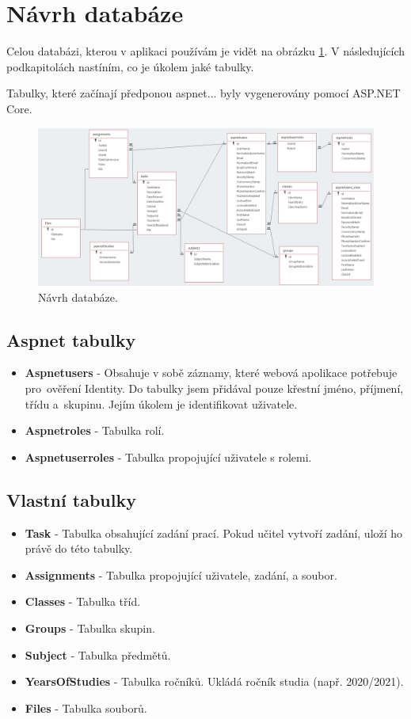 \documentclass[a4paper, 12pt]{report}
\begin{document}
	\section{Návrh databáze}
	Celou databázi, kterou v aplikaci používám je vidět na obrázku \ref{NavrhDatabaze}. V následujících podkapitolách nastíním, co je úkolem jaké tabulky.\par
	Tabulky, které začínají předponou aspnet... byly vygenerovány pomocí ASP.NET Core.
	\begin{figure}[h!]
		\includegraphics[width=\textwidth]{Databaze}
		\caption{Návrh databáze.}
		\label{NavrhDatabaze}
	\end{figure}

	\subsection{Aspnet tabulky}
	\begin{itemize}
		\item \textbf{Aspnetusers} - Obsahuje v sobě záznamy, které webová apolikace potřebuje pro~ověření Identity. Do tabulky jsem přidával pouze křestní jméno, příjmení, třídu a~skupinu. Jejím úkolem je identifikovat uživatele.
		\item \textbf{Aspnetroles} - Tabulka rolí.
		\item \textbf{Aspnetuserroles} - Tabulka propojující uživatele s rolemi.
	\end{itemize}

	\subsection{Vlastní tabulky}
	\begin{itemize}
		\item \textbf{Task} - Tabulka obsahující zadání prací. Pokud učitel vytvoří zadání, uloží ho právě do této tabulky.
		\item \textbf{Assignments} - Tabulka propojující uživatele, zadání, a soubor.
		\item \textbf{Classes} - Tabulka tříd.
		\item \textbf{Groups} - Tabulka skupin.
		\item \textbf{Subject} - Tabulka předmětů.
		\item \textbf{YearsOfStudies} - Tabulka ročníků. Ukládá ročník studia (např. 2020/2021).
		\item \textbf{Files} - Tabulka souborů.
	\end{itemize}
\end{document}

